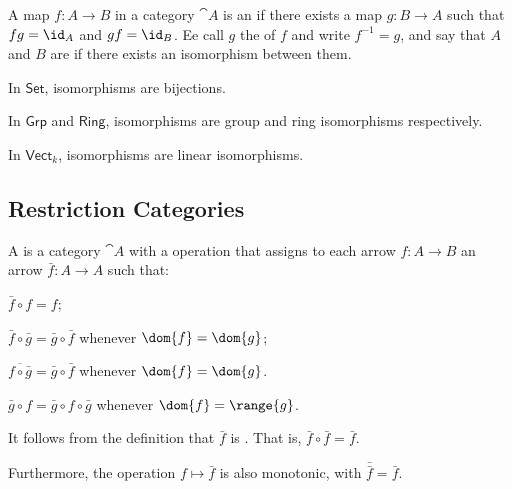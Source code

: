 \begin{definition}
  A map $f : A \to B$ in a category $\cat{A}$ is an  if there exists
  a map $g : B \to A$ such that $fg = \id_A$ and $gf = \id_B$.
  Ee call $g$ the  of $f$ and write $f^{-1} = g$,
  and say that $A$ and $B$ are 
  if there exists an isomorphism between them.

  \begin{examples}
    \begin{enumarabic}
      \item In $\mathsf{Set}$, isomorphisms are bijections.
      \item In $\mathsf{Grp}$ and $\mathsf{Ring}$, isomorphisms are
        group and ring isomorphisms respectively.
      \item In $\mathsf{Vect}_k$, isomorphisms are linear isomorphisms.
    \end{enumarabic}
  \end{examples}

\end{definition}

\subsection{Restriction Categories}
\begin{definition}
  A  is a category $\cat{A}$ with a
   operation that assigns to each arrow $f : A \to B$
  an arrow $\bar{f} : A \to A$ such that:
  \begin{enumarabic}
    \item $\bar{f} \circ f = f$;
    \item $\bar{f} \circ \bar{g} = \bar{g} \circ \bar{f}$
      whenever $\dom{f} = \dom{g}$;
    \item $\overline{f \circ \bar{g}} = \bar{g} \circ \bar{f}$
      whenever $\dom{f} = \dom{g}$.
    \item $\bar{g} \circ f = \bar{g} \circ f \circ \bar{g}$
      whenever $\dom{f} = \range{g}$.
  \end{enumarabic}
\end{definition}

\begin{remark}
  It follows from the definition that $\bar{f}$ is .
  That is, $\bar{f} \circ \bar{f} = \bar{f}$.

  Furthermore, the operation $f \mapsto \bar{f}$ is also monotonic,
  with $\bar{\bar{f}} = \bar{f}$.
\end{remark}

